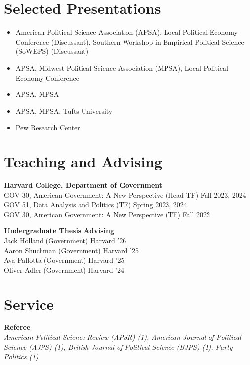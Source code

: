 \documentclass[11pt, letterpaper]{article}
\begin{document}
\section{Selected Presentations}

\begin{itemize}[leftmargin=4em, labelindent=1em, labelwidth=2.6em, labelsep=0.4em, align=left, itemsep=0pt, parsep=0pt, topsep=0pt, before=\raggedright]
    \item[2026:] American Political Science Association (APSA), Local Political Economy Conference (Discussant), Southern Workshop in Empirical Political Science (SoWEPS) (Discussant)
    \item[2025:] APSA, Midwest Political Science Association (MPSA), Local Political Economy Conference
    \item[2024:] APSA, MPSA
    \item[2023:] APSA, MPSA, Tufts University
    \item[2020:] Pew Research Center
\end{itemize}

\section{Teaching and Advising}

\textbf{Harvard College, Department of Government}\\
GOV 30, American Government: A New Perspective (Head TF) \hfill Fall 2023, 2024\\
GOV 51, Data Analysis and Politics (TF) \hfill Spring 2023, 2024\\
GOV 30, American Government: A New Perspective (TF) \hfill Fall 2022

\vspace{1ex}
\noindent\textbf{Undergraduate Thesis Advising}\\
Jack Holland (Government) \hfill Harvard '26\\
Aaron Shuchman (Government) \hfill Harvard '25\\
Ava Pallotta (Government) \hfill Harvard '25\\
Oliver Adler (Government) \hfill Harvard '24

\section{Service}

\textbf{Referee}\\
\textit{American Political Science Review (APSR) (1), American Journal of Political Science (AJPS) (1), British Journal of Political Science (BJPS) (1), Party Politics (1)}
\end{document}
